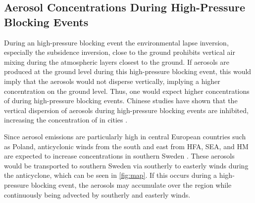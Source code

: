 \subsection{Aerosol Concentrations During High-Pressure Blocking Events}
During an high-pressure blocking event the environmental lapse inversion, especially the subsidence inversion, close to the ground prohibits vertical air mixing during the atmospheric layers closest to the ground. If aerosols are produced at the ground level during this high-pressure blocking event, this would imply that the aerosols would not disperse vertically, implying a higher concentration on the ground level. Thus, one would expect higher concentrations of \PM during high-pressure blocking events. Chinese studies have shown that the vertical dispersion of aerosols during high-pressure blocking events are inhibited, increasing the concentration of \PM in cities \cite{caiImpactBlockingStructure2020}.

Since aerosol emissions are particularly high in central European countries such as Poland, anticyclonic winds from the south and east from HFA, SEA, and HM are expected to increase \PM concentrations in southern Sweden \cite{europeanenvironmentagencyEuropesAirQuality2024}. These aerosols would be transported to southern Sweden via southerly to easterly winds during the anticyclone, which can be seen in \autoref{fig:map}. If this occurs during a high-pressure blocking event, the aerosols may accumulate over the region while continuously being advected by southerly and easterly winds. 


